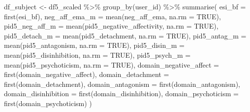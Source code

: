 \documentclass[
  11pt,
  a4paper,
  onecolumn]{article}
\newenvironment{Shaded}{}{}
\newcommand{\AttributeTok}[1]{\textcolor[rgb]{0.84,0.23,0.29}{#1}}
\newcommand{\ConstantTok}[1]{\textcolor[rgb]{0.00,0.36,0.77}{#1}}
\newcommand{\FunctionTok}[1]{\textcolor[rgb]{0.44,0.26,0.76}{#1}}
\newcommand{\NormalTok}[1]{\textcolor[rgb]{0.14,0.16,0.18}{#1}}
\newcommand{\OtherTok}[1]{\textcolor[rgb]{0.44,0.26,0.76}{#1}}
\newcommand{\SpecialCharTok}[1]{\textcolor[rgb]{0.00,0.36,0.77}{#1}}
\begin{document}
\begin{Shaded}
\begin{Highlighting}[]
\NormalTok{df\_subject }\OtherTok{\textless{}{-}}\NormalTok{ df5\_scaled }\SpecialCharTok{\%\textgreater{}\%}
  \FunctionTok{group\_by}\NormalTok{(user\_id) }\SpecialCharTok{\%\textgreater{}\%}
  \FunctionTok{summarise}\NormalTok{(}
    \AttributeTok{esi\_bf =} \FunctionTok{first}\NormalTok{(esi\_bf),}
    \AttributeTok{neg\_aff\_ema\_m =} \FunctionTok{mean}\NormalTok{(neg\_aff\_ema, }\AttributeTok{na.rm =} \ConstantTok{TRUE}\NormalTok{),}
    \AttributeTok{pid5\_neg\_aff\_m =} \FunctionTok{mean}\NormalTok{(pid5\_negative\_affectivity, }\AttributeTok{na.rm =} \ConstantTok{TRUE}\NormalTok{),}
    \AttributeTok{pid5\_detach\_m =} \FunctionTok{mean}\NormalTok{(pid5\_detachment, }\AttributeTok{na.rm =} \ConstantTok{TRUE}\NormalTok{),}
    \AttributeTok{pid5\_antag\_m =} \FunctionTok{mean}\NormalTok{(pid5\_antagonism, }\AttributeTok{na.rm =} \ConstantTok{TRUE}\NormalTok{),}
    \AttributeTok{pid5\_disin\_m =} \FunctionTok{mean}\NormalTok{(pid5\_disinhibition, }\AttributeTok{na.rm =} \ConstantTok{TRUE}\NormalTok{),}
    \AttributeTok{pid5\_psych\_m =} \FunctionTok{mean}\NormalTok{(pid5\_psychoticism, }\AttributeTok{na.rm =} \ConstantTok{TRUE}\NormalTok{),}
    \AttributeTok{domain\_negative\_affect =} \FunctionTok{first}\NormalTok{(domain\_negative\_affect),}
    \AttributeTok{domain\_detachment =} \FunctionTok{first}\NormalTok{(domain\_detachment),}
    \AttributeTok{domain\_antagonism =} \FunctionTok{first}\NormalTok{(domain\_antagonism),}
    \AttributeTok{domain\_disinhibition =} \FunctionTok{first}\NormalTok{(domain\_disinhibition),}
    \AttributeTok{domain\_psychoticism =} \FunctionTok{first}\NormalTok{(domain\_psychoticism)}
\NormalTok{  )}
\end{Highlighting}
\end{Shaded}
\end{document}
